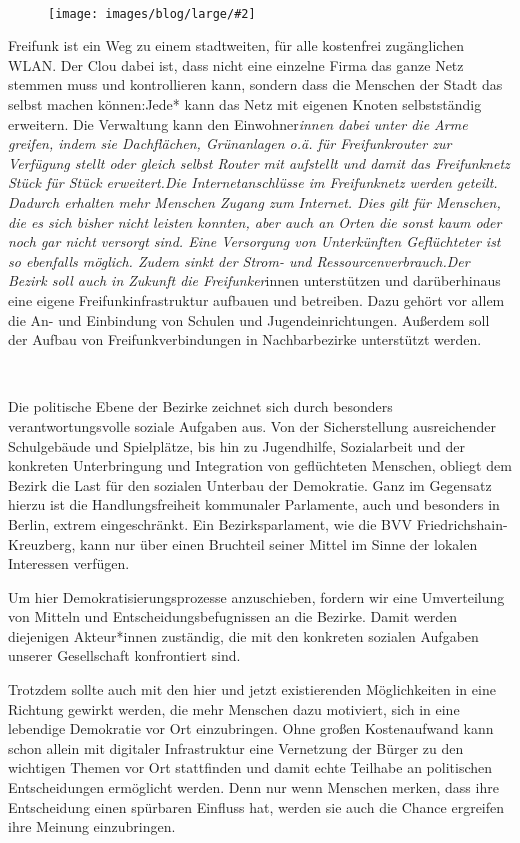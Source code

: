 \documentclass[a4paper,10pt]{article}
\newcommand{\mysection}[1]{{\vspace{1cm}\noindent\color{gray}{\ttfamily\LARGE\raggedright #1}\\\medskip}}
\newcommand{\abschnitt}[2]{%
\mysection{\raggedright #1}%
\begin{figure}[t]%
\vspace*{-2.7cm}%
\hspace*{-2.1cm}%
\texttt{[image: images/blog/large/\#2]} %
\end{figure}%
}
\begin{document}
\clearpage
\abschnitt{Freifunk}{routerallerlaender.jpg}

Freifunk ist ein Weg zu einem stadtweiten, für alle kostenfrei
zugänglichen WLAN. Der Clou dabei ist, dass nicht eine einzelne Firma
das ganze Netz stemmen muss und kontrollieren kann, sondern dass die
Menschen der Stadt das selbst machen können:Jede* kann das Netz mit
eigenen Knoten selbstständig erweitern. Die Verwaltung kann den
Einwohner\emph{innen dabei unter die Arme greifen, indem sie
Dachflächen, Grünanlagen o.ä. für Freifunkrouter zur Verfügung stellt
oder gleich selbst Router mit aufstellt und damit das Freifunknetz Stück
für Stück erweitert.Die Internetanschlüsse im Freifunknetz werden
geteilt. Dadurch erhalten mehr Menschen Zugang zum Internet. Dies gilt
für Menschen, die es sich bisher nicht leisten konnten, aber auch an
Orten die sonst kaum oder noch gar nicht versorgt sind. Eine Versorgung
von Unterkünften Geflüchteter ist so ebenfalls möglich. Zudem sinkt der
Strom- und Ressourcenverbrauch.Der Bezirk soll auch in Zukunft die
Freifunker}innen unterstützen und darüberhinaus eine eigene
Freifunkinfrastruktur aufbauen und betreiben. Dazu gehört vor allem die
An- und Einbindung von Schulen und Jugendeinrichtungen. Außerdem soll
der Aufbau von Freifunkverbindungen in Nachbarbezirke unterstützt
werden.

\mysection{Soziales}

Die politische Ebene der Bezirke zeichnet sich durch besonders
verantwortungsvolle soziale Aufgaben aus. Von der Sicherstellung
ausreichender Schulgebäude und Spielplätze, bis hin zu Jugendhilfe,
Sozialarbeit und der konkreten Unterbringung und Integration von
geflüchteten Menschen, obliegt dem Bezirk die Last für den sozialen
Unterbau der Demokratie. Ganz im Gegensatz hierzu ist die
Handlungsfreiheit kommunaler Parlamente, auch und besonders in Berlin,
extrem eingeschränkt. Ein Bezirksparlament, wie die BVV
Friedrichshain-Kreuzberg, kann nur über einen Bruchteil seiner Mittel im
Sinne der lokalen Interessen verfügen.

Um hier Demokratisierungsprozesse anzuschieben, fordern wir eine
Umverteilung von Mitteln und Entscheidungsbefugnissen an die Bezirke.
Damit werden diejenigen Akteur*innen zuständig, die mit den konkreten
sozialen Aufgaben unserer Gesellschaft konfrontiert sind.

Trotzdem sollte auch mit den hier und jetzt existierenden Möglichkeiten
in eine Richtung gewirkt werden, die mehr Menschen dazu motiviert, sich
in eine lebendige Demokratie vor Ort einzubringen. Ohne großen
Kostenaufwand kann schon allein mit digitaler Infrastruktur eine
Vernetzung der Bürger zu den wichtigen Themen vor Ort stattfinden und
damit echte Teilhabe an politischen Entscheidungen ermöglicht werden.
Denn nur wenn Menschen merken, dass ihre Entscheidung einen spürbaren
Einfluss hat, werden sie auch die Chance ergreifen ihre Meinung
einzubringen.
\end{document}

